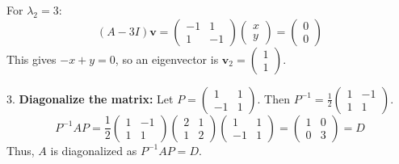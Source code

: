     For \(\lambda_2 = 3\):
    \[
    (A - 3I)\mathbf{v} = \begin{pmatrix}
    -1 & 1 \\
    1 & -1
    \end{pmatrix} \begin{pmatrix}
    x \\
    y
    \end{pmatrix} = \begin{pmatrix}
    0 \\
    0
    \end{pmatrix}
    \]
    This gives \(-x + y = 0\), so an eigenvector is \(\mathbf{v}_2 = \begin{pmatrix} 1 \\ 1 \end{pmatrix}\).

3.  \textbf{Diagonalize the matrix:}
    Let \(P = \begin{pmatrix} 1 & 1 \\ -1 & 1 \end{pmatrix}\). Then \(P^{-1} = \frac{1}{2} \begin{pmatrix} 1 & -1 \\ 1 & 1 \end{pmatrix}\).
    \[
    P^{-1}AP = \frac{1}{2} \begin{pmatrix} 1 & -1 \\ 1 & 1 \end{pmatrix} \begin{pmatrix} 2 & 1 \\ 1 & 2 \end{pmatrix} \begin{pmatrix} 1 & 1 \\ -1 & 1 \end{pmatrix} = \begin{pmatrix} 1 & 0 \\ 0 & 3 \end{pmatrix} = D
    \]
    Thus, \(A\) is diagonalized as \(P^{-1}AP = D\).

\newpage